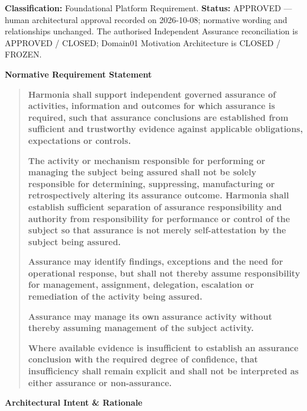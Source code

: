 \textbf{Classification:} Foundational Platform Requirement. \textbf{Status:} APPROVED — human architectural approval recorded on 2026-10-08; normative wording and relationships unchanged. The authorised Independent Assurance reconciliation is APPROVED / CLOSED; Domain01 Motivation Architecture is CLOSED / FROZEN.



\par\medskip\textbf{Normative Requirement Statement}\par


\begin{quote}


\textbf{Harmonia shall support independent governed assurance of activities, information and outcomes for which assurance is required, such that assurance conclusions are established from sufficient and trustworthy evidence against applicable obligations, expectations or controls.}



\textbf{The activity or mechanism responsible for performing or managing the subject being assured shall not be solely responsible for determining, suppressing, manufacturing or retrospectively altering its assurance outcome. Harmonia shall establish sufficient separation of assurance responsibility and authority from responsibility for performance or control of the subject so that assurance is not merely self-attestation by the subject being assured.}



\textbf{Assurance may identify findings, exceptions and the need for operational response, but shall not thereby assume responsibility for management, assignment, delegation, escalation or remediation of the activity being assured.}



\textbf{Assurance may manage its own assurance activity without thereby assuming management of the subject activity.}



\textbf{Where available evidence is insufficient to establish an assurance conclusion with the required degree of confidence, that insufficiency shall remain explicit and shall not be interpreted as either assurance or non-assurance.}



\end{quote}


\par\medskip\textbf{Architectural Intent \& Rationale}\par


